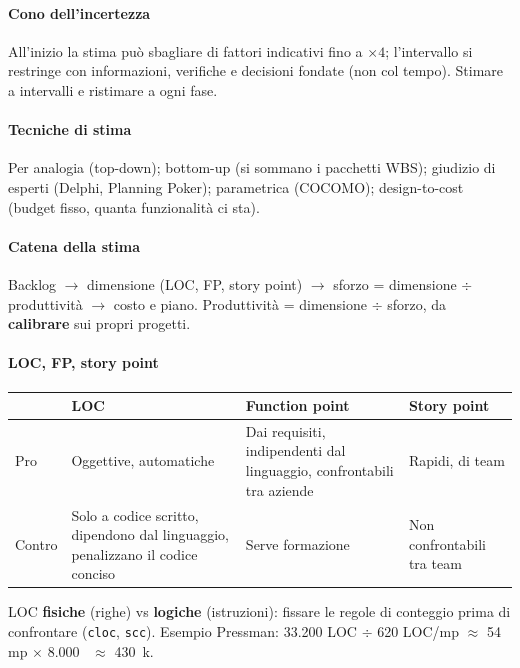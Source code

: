 \documentclass[12pt]{extarticle}
\begin{document}
\paragraph{Cono dell'incertezza} All'inizio la stima può sbagliare di fattori indicativi fino a $\times4$; l'intervallo si restringe con informazioni, verifiche e decisioni fondate (non col tempo). Stimare a intervalli e ristimare a ogni fase.

\paragraph{Tecniche di stima} Per analogia (top-down); bottom-up (si sommano i pacchetti WBS); giudizio di esperti (Delphi, Planning Poker); parametrica (COCOMO); design-to-cost (budget fisso, quanta funzionalità ci sta).

\paragraph{Catena della stima} Backlog $\rightarrow$ dimensione (LOC, FP, story point) $\rightarrow$ sforzo = dimensione $\div$ produttività $\rightarrow$ costo e piano. Produttività = dimensione $\div$ sforzo, da \textbf{calibrare} sui propri progetti.

\paragraph{LOC, FP, story point}
\begin{center}
\small
\begin{tabular}{p{2.4cm}p{4.2cm}p{4.2cm}p{3.4cm}}
    \toprule
     & \textbf{LOC} & \textbf{Function point} & \textbf{Story point} \\
    \midrule
    Pro & Oggettive, automatiche & Dai requisiti, indipendenti dal linguaggio, confrontabili tra aziende & Rapidi, di team \\
    \addlinespace
    Contro & Solo a codice scritto, dipendono dal linguaggio, penalizzano il codice conciso & Serve formazione & Non confrontabili tra team \\
    \bottomrule
\end{tabular}
\end{center}
LOC \textbf{fisiche} (righe) vs \textbf{logiche} (istruzioni): fissare le regole di conteggio prima di confrontare (\texttt{cloc}, \texttt{scc}). Esempio Pressman: 33.200 LOC $\div$ 620 LOC/mp $\approx$ 54 mp $\times$ 8.000~\texteuro{} $\approx$ 430~k\texteuro.
\end{document}
